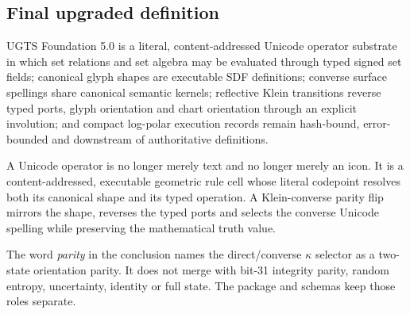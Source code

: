 \documentclass[11pt,a4paper]{article}
\begin{document}
\subsection{Final upgraded definition}
\begin{definitionbox}
UGTS Foundation 5.0 is a literal, content-addressed Unicode operator substrate in which set relations and set algebra may be evaluated through typed signed set fields; canonical glyph shapes are executable SDF definitions; converse surface spellings share canonical semantic kernels; reflective Klein transitions reverse typed ports, glyph orientation and chart orientation through an explicit involution; and compact log-polar execution records remain hash-bound, error-bounded and downstream of authoritative definitions.
\end{definitionbox}

\begin{conclusionbox}
A Unicode operator is no longer merely text and no longer merely an icon. It is a content-addressed, executable geometric rule cell whose literal codepoint resolves both its canonical shape and its typed operation. A Klein-converse parity flip mirrors the shape, reverses the typed ports and selects the converse Unicode spelling while preserving the mathematical truth value.
\end{conclusionbox}

\begin{evidencebox}
The word \emph{parity} in the conclusion names the direct/converse \(\kappa\) selector as a two-state orientation parity. It does not merge with bit-31 integrity parity, random entropy, uncertainty, identity or full state. The package and schemas keep those roles separate.
\end{evidencebox}

\clearpage
\appendix
\end{document}
